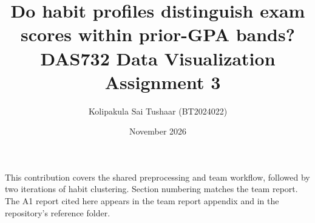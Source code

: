 \documentclass[11pt]{article}
\title{\textbf{Do habit profiles distinguish exam scores within prior-GPA bands?}\\[6pt]
\large DAS732 Data Visualization \textperiodcentered\ Assignment 3}
\author{Kolipakula Sai Tushaar (BT2024022)}
\date{November 2026}
\begin{document}
\maketitle
\noindent This contribution covers the shared preprocessing and team workflow, followed by two iterations of habit clustering. Section numbering matches the team report. The A1 report cited here appears in the team report appendix and in the repository's reference folder.
\setcounter{section}{1}


\clearpage

\clearpage

\end{document}
